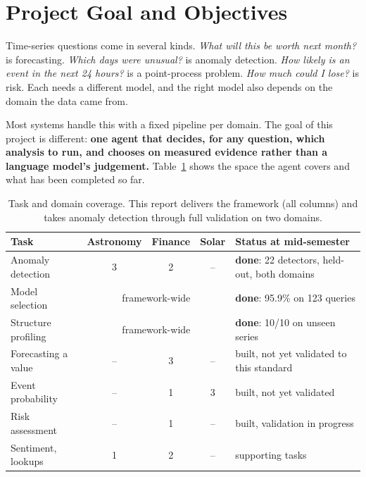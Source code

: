 \documentclass[11pt,a4paper]{article}
\newcommand{\done}{\textbf{done}}
\begin{document}
\section{Project Goal and Objectives}

Time-series questions come in several kinds. \emph{What will this be worth next
month?} is forecasting. \emph{Which days were unusual?} is anomaly detection.
\emph{How likely is an event in the next 24 hours?} is a point-process problem.
\emph{How much could I lose?} is risk. Each needs a different model, and the
right model also depends on the domain the data came from.

Most systems handle this with a fixed pipeline per domain. The goal of this
project is different: \textbf{one agent that decides, for any question, which
analysis to run, and chooses on measured evidence rather than a language
model's judgement.} Table~\ref{tab:matrix} shows the space the agent covers and
what has been completed so far.

\begin{table}[h]
\centering\small
\caption{Task and domain coverage. This report delivers the framework (all
columns) and takes anomaly detection through full validation on two domains.}
\label{tab:matrix}
\begin{tabular}{@{}lcccl@{}}
\toprule
\textbf{Task} & \textbf{Astronomy} & \textbf{Finance} & \textbf{Solar} &
\textbf{Status at mid-semester} \\
\midrule
Anomaly detection      & 3 & 2 & -- & \done: 22 detectors, held-out, both domains \\
Model selection        & \multicolumn{3}{c}{framework-wide} & \done: 95.9\% on 123 queries \\
Structure profiling    & \multicolumn{3}{c}{framework-wide} & \done: 10/10 on unseen series \\
Forecasting a value    & -- & 3 & -- & built, not yet validated to this standard \\
Event probability      & -- & 1 & 3 & built, not yet validated \\
Risk assessment        & -- & 1 & -- & built, validation in progress \\
Sentiment, lookups     & 1 & 2 & -- & supporting tasks \\
\bottomrule
\end{tabular}
\end{table}
\end{document}
